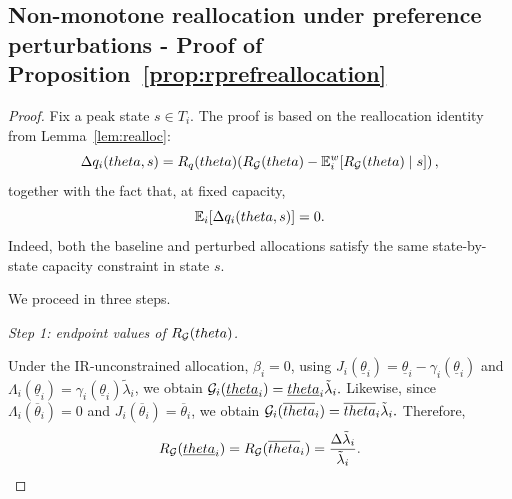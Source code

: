 \documentclass{class}
\begin{document}
\subsection{Non-monotone reallocation under preference perturbations - Proof of Proposition~\ref{prop:rprefreallocation}}\label{proof:rprefreallocation}


\begin{proof}
Fix a peak state $s\in T_i$. The proof is based on the reallocation identity from Lemma~\ref{lem:realloc}:
\begin{equation}\label{eq:realloc-proof}
\Delta q_i(theta,s)
=
R_q(theta)\!\left(
R_{\mathcal{G}}(theta)-\mathbb{E}_i^w\!\left[R_{\mathcal{G}}(theta)\mid s\right]
\right),
\end{equation}
together with the fact that, at fixed capacity,
\begin{equation}\label{eq:mean-zero-proof}
\mathbb{E}_i[\Delta q_i(theta,s)]=0.
\end{equation}
Indeed, both the baseline and perturbed allocations satisfy the same state-by-state capacity constraint in state $s$.

We proceed in three steps.

\noindent\textit{Step 1: endpoint values of $R_{\mathcal{G}}(theta)$.}

Under the IR-unconstrained allocation, $\beta_i=0$, using $J_i(\underline\theta_i)=\underline\theta_i-\gamma_i(\underline\theta_i)$ and
$\Lambda_i(\underline\theta_i)=\gamma_i(\underline\theta_i)\tilde\lambda_i$, we obtain
$\mathcal{G}_i(\underline{theta}_i)=\underline{theta}_i\tilde\lambda_i.$
Likewise, since $\Lambda_i(\overline\theta_i)=0$ and $J_i(\overline\theta_i)=\overline\theta_i$, we obtain
$\mathcal{G}_i(\overline{theta}_i)=\overline{theta}_i\tilde\lambda_i.$
Therefore,
\begin{equation}\label{eq:endpoint-unconstrained}
R_{\mathcal{G}}(\underline{theta}_i)
=
R_{\mathcal{G}}(\overline{theta}_i)
=
\frac{\Delta\tilde\lambda_i}{\tilde\lambda_i}.
\end{equation}


\end{proof}
\end{document}
